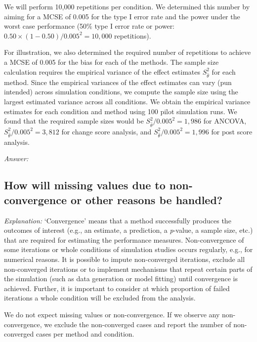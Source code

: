 \documentclass[12pt]{article}
\begin{document}
\begin{examplebox}
We will perform 10,000 repetitions per condition. We determined this number by aiming for a MCSE of 0.005 for the type I error rate and the power under the worst case performance (50\% type I error rate or power: $0.50 \times (1 - 0.50) / 0.005^2 = 10{,}000$ repetitions).

For illustration, we also determined the required number of repetitions to achieve a MCSE of 0.005 for the bias for each of the methods. The sample size calculation requires the empirical variance of the effect estimates $S_{\hat{\theta}}^2$ for each method. Since the empirical variances of the effect estimates can vary (pun intended) across simulation conditions, we compute the sample size using the largest estimated variance across all conditions. We obtain the empirical variance estimates for each condition and method using 100 pilot simulation runs. We found that the required sample sizes would be $S_{\hat{\theta}}^2/0.005^2 = 1{,}986$ for ANCOVA, $S_{\hat{\theta}}^2/0.005^2 = 3{,}812$ for change score analysis, and $S_{\hat{\theta}}^2/0.005^2 = 1{,}996$ for post score analysis.
\end{examplebox}

\textit{Answer:}




\subsection{How will missing values due to non-convergence or other reasons be handled?}

\textit{Explanation:} `Convergence' means that a method successfully produces the outcomes of interest (e.g., an estimate, a prediction, a \textit{p}-value, a sample size, etc.) that are required for estimating the performance measures. Non-convergence of some iterations or whole conditions of simulation studies occurs regularly, e.g., for numerical reasons. It is possible to impute non-converged iterations, exclude all non-converged iterations or to implement mechanisms that repeat certain parts of the simulation (such as data generation or model fitting) until convergence is achieved. Further, it is important to consider at which proportion of failed iterations a whole condition will be excluded from the analysis.

\begin{examplebox}
We do not expect missing values or non-convergence. If we observe any non-convergence, we exclude the non-converged cases and report the number of non-converged cases per method and condition.
\end{examplebox}
\end{document}
